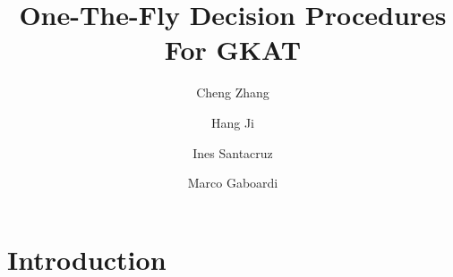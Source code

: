 \documentclass{extarticle}
\begin{document}
\title{One-The-Fly Decision Procedures For GKAT}         
 


\author{
    Cheng Zhang \and 
    Hang Ji \and 
    Ines Santacruz \and 
    Marco Gaboardi
}
\date{}

\maketitle


\begin{abstract}
\end{abstract}

\section{Introduction}
\end{document}
